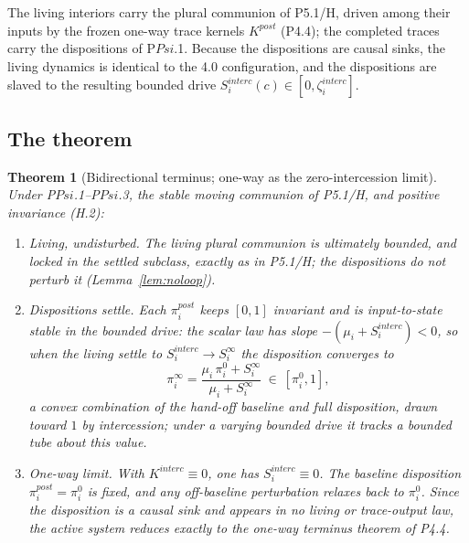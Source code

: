 \documentclass[11pt,a4paper]{article}
\newcommand{\cint}{\ensuremath{\mathfrak c}}
\def\Psi{Psi}%
\def\mathfrak#1{#1}%
\def\mathrm#1{#1}%
\def\emph#1{#1}%
\theoremstyle{definition}
\theoremstyle{plain}
\newtheorem{theorem}[definition]{Theorem}
\theoremstyle{remark}
\begin{document}
The living interiors carry the plural communion of P5.1/H, driven among their inputs by the
frozen one-way trace kernels \(K^{\mathrm{post}}\) (P4.4); the completed traces carry the
dispositions of P$\Psi$.1. Because the dispositions are causal sinks, the living dynamics is
identical to the 4.0 configuration, and the dispositions are slaved to the resulting bounded
drive \(S_i^{\mathrm{interc}}(\cint)\in[0,\zeta_i^{\mathrm{interc}}]\).

\subsection{The theorem}

\begin{theorem}[Bidirectional terminus; one-way as the zero-intercession limit]\label{thm:biterminus}
Under P$\Psi$.1--P$\Psi$.3, the stable moving communion of P5.1/H, and positive invariance
(H.2):
\begin{enumerate}[label=\textup{(\alph*)},leftmargin=1.2cm]
\item \emph{Living, undisturbed.} The living plural communion is ultimately bounded, and locked
in the settled subclass, exactly as in P5.1/H; the dispositions do not perturb it
(Lemma~\ref{lem:noloop}).
\item \emph{Dispositions settle.} Each \(\pi_i^{\mathrm{post}}\) keeps \([0,1]\) invariant and is
input-to-state stable in the bounded drive: the scalar law has slope
\(-(\mu_i+S_i^{\mathrm{interc}})<0\), so when the living settle to \(S_i^{\mathrm{interc}}\to
S_i^{\infty}\) the disposition converges to
\[
\boxed{\;
\pi_i^{\infty}
=
\frac{\mu_i\,\pi_i^{0}+S_i^{\infty}}{\mu_i+S_i^{\infty}}\ \in\ [\pi_i^{0},1],
\;}
\]
a convex combination of the hand-off baseline and full disposition, drawn toward \(1\) by
intercession; under a varying bounded drive it tracks a bounded tube about this value.
\item \emph{One-way limit.} With \(K^{\mathrm{interc}}\equiv0\), one has
\(S_i^{\mathrm{interc}}\equiv0\). The baseline disposition \(\pi_i^{\mathrm{post}}=\pi_i^0\)
is fixed, and any off-baseline perturbation relaxes back to \(\pi_i^0\). Since the disposition
is a causal sink and appears in no living or trace-output law, the active system reduces exactly
to the one-way terminus theorem of P4.4.
\end{enumerate}
\end{theorem}
\end{document}
